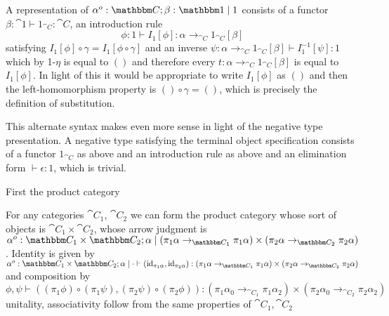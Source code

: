 \documentclass{article}
\begin{document}
A representation of $\alpha^o:\cat C; \beta : \cat 1 \pipe 1$ consists
of a functor $\beta : \cat 1 \vdash 1_{\cat C} : \cat C$, an introduction rule
\[ \phi : 1 \vdash I_{1}[\phi] : \alpha \to_{\cat C} 1_{\cat C}[\beta] \]
satisfying $I_{1}[\phi] \circ \gamma =I_{1}[\phi \circ \gamma]$ and an
inverse $\psi : \alpha \to_{\cat C} 1_{\cat C}[\beta] \vdash
I_{1}^{-1}[\psi] : 1$ which by \textsc{1-$\eta$} is equal to $()$ and
therefore every $t : \alpha \to_{\cat C} 1_{\cat C}[\beta]$ is equal
to $I_{1}[\phi]$. In light of this it would be appropriate to write
$I_1[\phi]$ as $()$ and then the left-homomorphism property is $()
\circ \gamma = ()$, which is precisely the definition of substitution.

This alternate syntax makes even more sense in light of the negative
type presentation. A negative type satisfying the terminal object
specification consists of a functor $1_{\cat C}$ as above and an
introduction rule as above and an elimination form $\vdash \epsilon :
1$, which is trivial.

First the product category
\begin{definition}
  For any categories $\cat C_1$, $\cat C_2$ we can form the product
  category whose sort of objects is $\cat C_1 \times \cat C_2$, whose
  arrow judgment is $\alpha^o : \cat C_1 \times \cat C_2;\alpha \pipe
  (\pi_1 \alpha \to_{\cat C_1} \pi_1 \alpha) \times (\pi_2 \alpha
  \to_{\cat C_2} \pi_2 \alpha)$. Identity is given by $\alpha^o : \cat
  C_1 \times \cat C_2;\alpha\pipe\cdot \vdash (\id_{\pi_1 \alpha},
  \id_{\pi_2 \alpha}) : (\pi_1 \alpha \to_{\cat C_1} \pi_1 \alpha)
  \times (\pi_2 \alpha \to_{\cat C_2} \pi_2 \alpha)$ and composition
  by
  \[
  \phi %
  ,
  \psi %
  \vdash ((\pi_1 \phi) \circ (\pi_1 \psi), (\pi_2 \psi) \circ (\pi_2 \phi)) :
  (\pi_1 \alpha_0 \to_{\cat C_1} \pi_1 \alpha_2) \times (\pi_2 \alpha_0 \to_{\cat C_2} \pi_2 \alpha_2)  
  \]
  unitality, associativity follow from the same properties of $\cat C_1,\cat C_2$
\end{definition}
\end{document}
